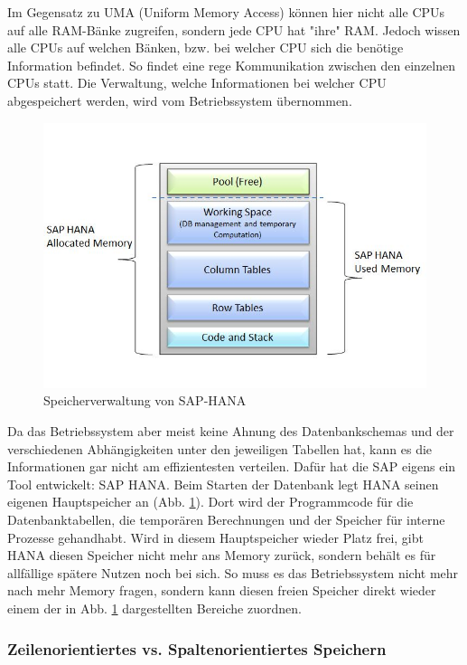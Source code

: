\documentclass[a4paper, 11pt, nofootinbib]{article}
\begin{document}
Im Gegensatz zu UMA (Uniform Memory Access) können hier nicht alle CPUs auf alle RAM-Bänke zugreifen, sondern jede CPU hat "ihre" RAM. Jedoch wissen alle CPUs auf welchen Bänken, bzw. bei welcher CPU sich die benötige Information befindet. So findet eine rege Kommunikation zwischen den einzelnen CPUs statt. Die Verwaltung, welche Informationen bei welcher CPU abgespeichert werden, wird vom Betriebssystem übernommen.

\newpage

\begin{figure}
	\centering
	\includegraphics[keepaspectratio=true,height=15\baselineskip]{SAP-HANA.jpg}
	\caption{Speicherverwaltung von SAP-HANA}
	\label{fig:sap_hana}
\end{figure}

Da das Betriebssystem aber meist keine Ahnung des Datenbankschemas und der verschiedenen Abhängigkeiten unter den jeweiligen Tabellen hat, kann es die Informationen gar nicht am effizientesten verteilen. Dafür hat die SAP eigens ein Tool entwickelt: SAP HANA. Beim Starten der Datenbank legt HANA seinen eigenen Hauptspeicher an (Abb. \ref{fig:sap_hana}). Dort wird der Programmcode für die Datenbanktabellen, die temporären Berechnungen und der Speicher für interne Prozesse gehandhabt. Wird in diesem Hauptspeicher wieder Platz frei, gibt HANA diesen Speicher nicht mehr ans Memory zurück, sondern behält es für allfällige spätere Nutzen noch bei sich. So muss es das Betriebssystem nicht mehr nach mehr Memory fragen, sondern kann diesen freien Speicher direkt wieder einem der in Abb. \ref{fig:sap_hana} dargestellten Bereiche zuordnen.

\subsubsection{Zeilenorientiertes vs. Spaltenorientiertes Speichern}
\end{document}
